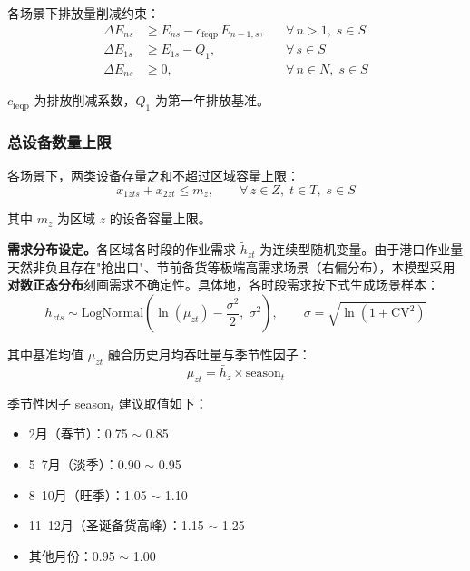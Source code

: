 \documentclass[12pt,a4paper]{article}
\newcommand{\手批注}[2]{\textcolor{#1}{\text{\kaishu #2}}}
\newcommand{\一阶段}{\textcolor{firststage}{\text{\kaishu （一阶段）}}}
\newcommand{\二阶段}{\textcolor{secondstage}{\text{\kaishu （二阶段）}}}
\begin{document}
各场景下排放量削减约束：
\begin{align}
    \Delta E_{ns} &\geq E_{ns} - c_{\text{feqp}} \, E_{n-1,s}, && \forall \, n > 1, \; s \in S
    \label{eq:cut1-s} \\[6pt]
    \Delta E_{1s} &\geq E_{1s} - Q_1, && \forall \, s \in S
    \label{eq:cut2-s} \\[6pt]
    \Delta E_{ns} &\geq 0, && \forall \, n \in N, \; s \in S
    \label{eq:cut3-s}
\end{align}

$c_{\text{feqp}}$ 为排放削减系数，$Q_1$ 为第一年排放基准。

\subsubsection{总设备数量上限}

各场景下，两类设备存量之和不超过区域容量上限：
\begin{equation}
    x_{1zts} + x_{2zt} \leq m_z, \qquad \forall \, z \in Z, \; t \in T, \; s \in S
    \label{eq:cap_total-s}
\end{equation}

其中 $m_z$ 为区域 $z$ 的设备容量上限。

\vspace{0.8em}
\noindent\textbf{需求分布设定。}各区域各时段的作业需求 $\tilde{h}_{zt}$ 为连续型随机变量。由于港口作业量天然非负且存在"抢出口"、节前备货等极端高需求场景（右偏分布），本模型采用\textbf{对数正态分布}刻画需求不确定性。具体地，各时段需求按下式生成场景样本：
\begin{equation}
    h_{zts} \sim \text{LogNormal}\left(\ln(\mu_{zt}) - \frac{\sigma^2}{2},\; \sigma^2\right), \qquad \sigma = \sqrt{\ln(1 + \text{CV}^2)}
    \label{eq:lognormal-param}
\end{equation}

其中基准均值 $\mu_{zt}$ 融合历史月均吞吐量与季节性因子：
\begin{equation}
    \mu_{zt} = \bar{h}_z \times \text{season}_t
    \label{eq:seasonal}
\end{equation}

季节性因子 season$_t$ 建议取值如下：
\begin{itemize}[itemsep=0.1em,leftmargin=2em]
    \item 2月（春节）：0.75 $\sim$ 0.85
    \item 5~7月（淡季）：0.90 $\sim$ 0.95
    \item 8~10月（旺季）：1.05 $\sim$ 1.10
    \item 11~12月（圣诞备货高峰）：1.15 $\sim$ 1.25
    \item 其他月份：0.95 $\sim$ 1.00
\end{itemize}
\end{document}
